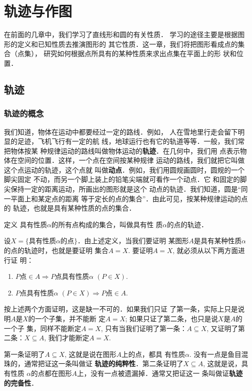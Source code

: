\chapter{轨迹与作图}
在前面的几章中，我们学习了直线形和圆的有关性质．
学习的途径主要是根据图形的定义和已知性质去推演图形的
其它性质．这一章，我们将把图形看成点的集合（点集），
研究如何根据点所具有的某种性质来求出点集在平面上的形
状和位置．

\section{轨迹}
\subsection{轨迹的概念}
我们知道，物体在运动中都要经过一定的路线．例如，
人在雪地里行走会留下明显的足迹，飞机飞行有一定的航
线，地球运行也有它的轨道等等．一般，我们常把物体按某
种规律运动的路线叫做物体运动的\textbf{轨迹}．在几何中，我们用
点表示物体在空间的位置．这样，一个点在空间按某种规律
运动的路线，我们就把它叫做这个点运动的轨迹，这个点就
叫做\textbf{动点}．例如，我们用圆规画圆时，圆规的一个脚尖固定
不动，而另一个脚上装上的铅笔尖端就可看作一个动点．它
和固定的脚尖保持一定的距离运动，所画出的图形就是这个
动点的轨迹．我们知道，圆是“同一平面上和某定点的距离
等于定长的点的集合”．由此可见，按某种规律运动的点的
轨迹，也就是具有某种性质的点的集合．

\begin{blk}{定义}
具有性质$\alpha$的所有点构成的集合，叫做具有性
质$\alpha$的点的轨迹．
\end{blk}

设$X=\{\text{具有性质$\alpha$的点}\}$．由上述定义，当我们要证明
某图形$A$是具有某种性质$\alpha$的点的轨迹时，也就是要证明
集合$A=X$. 要证明$A=X$, 就必须从以下两方面进行证
明：
\begin{enumerate}
\item $P$点$\in A\Rightarrow P$点具有性质$\alpha$ $(P\in X)$.
\item $P$点具有性质$\alpha$ $(P\in X)\Rightarrow P$点$\in A$.
\end{enumerate}

按上述两个方面证明，这是缺一不可的．如果我们只证
了第一条，实际上只是说明$A$是$X$的一个子集，并不能断
定$A=X$; 如果只证了第二条，也只是说$X$是$A$的一个子
集，同样不能断定$A=X$, 只有当我们证明了第一条：$A\subseteq
X$, 又证明了第二条：$X\subseteq A$, 我们才能断定$A=X$.

第一条证明了$A\subseteq X$, 这就是说在图形$A$上的点，都具
有性质$\alpha$. 没有一点是鱼目混珠的，通常把证这一条叫做证
\textbf{轨迹的纯粹性}．第二条证明了$X\subseteq A$, 这就是说，具有性质
$\alpha$的点都在图形$A$上，没有一点被遗漏掉．通常又把证这一
条叫做证\textbf{轨迹的完备性}．

